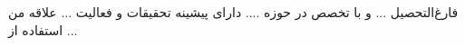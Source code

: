 

\begin{cvparagraph}

 فارغ‌التحصیل ... و با تخصص در حوزه .... دارای پیشینه تحقیقات و فعالیت ... علاقه من استفاده از ...
\end{cvparagraph}
